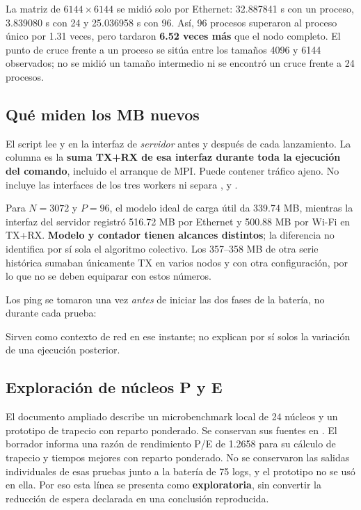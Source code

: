 La matriz de $6144\times6144$ se midió solo por Ethernet: 32.887841 s con un proceso, 3.839080 s con 24 y 25.036958 s con 96. Así, 96 procesos superaron al proceso único por 1.31 veces, pero tardaron \textbf{6.52 veces más} que el nodo completo. El punto de cruce frente a un proceso se sitúa entre los tamaños 4096 y 6144 observados; no se midió un tamaño intermedio ni se encontró un cruce frente a 24 procesos.

\clearpage
{}

\subsection{Qué miden los MB nuevos}
El script  lee  y  en la interfaz de \emph{servidor} antes y después de cada lanzamiento. La columna  es la \textbf{suma TX+RX de esa interfaz durante toda la ejecución del comando}, incluido el arranque de MPI. Puede contener tráfico ajeno. No incluye las interfaces de los tres workers ni separa ,  y .



Para $N=3072$ y $P=96$, el modelo ideal de carga útil da 339.74 MB, mientras la interfaz del servidor registró 516.72 MB por Ethernet y 500.88 MB por Wi-Fi en TX+RX. \textbf{Modelo y contador tienen alcances distintos}; la diferencia no identifica por sí sola el algoritmo colectivo. Los 357--358 MB de otra serie histórica sumaban únicamente TX en varios nodos y con otra configuración, por lo que no se deben equiparar con estos números.

Los ping se tomaron una vez \emph{antes} de iniciar las dos fases de la batería, no durante cada prueba:

Sirven como contexto de red en ese instante; no explican por sí solos la variación de una ejecución posterior.

\subsection{Exploración de núcleos P y E}
El documento ampliado describe un microbenchmark local de 24 núcleos y un prototipo de trapecio con reparto ponderado. Se conservan sus fuentes en . El borrador informa una razón de rendimiento P/E de 1.2658 para su cálculo de trapecio y tiempos mejores con reparto ponderado. No se conservaron las salidas individuales de esas pruebas junto a la batería de 75 logs, y el prototipo no se usó en ella. Por eso esta línea se presenta como \textbf{exploratoria}, sin convertir la reducción de espera declarada en una conclusión reproducida.

